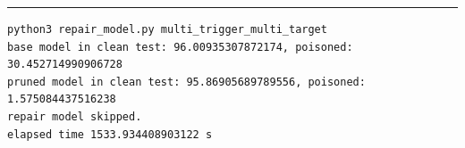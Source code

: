 \documentclass[letterpaper]{article}
\begin{document}
\noindent\rule{2cm}{0.4pt}
\begin{lstlisting}
python3 repair_model.py multi_trigger_multi_target
base model in clean test: 96.00935307872174, poisoned: 30.452714990906728
pruned model in clean test: 95.86905689789556, poisoned: 1.575084437516238
repair model skipped.
elapsed time 1533.934408903122 s
\end{lstlisting}






\end{document}
